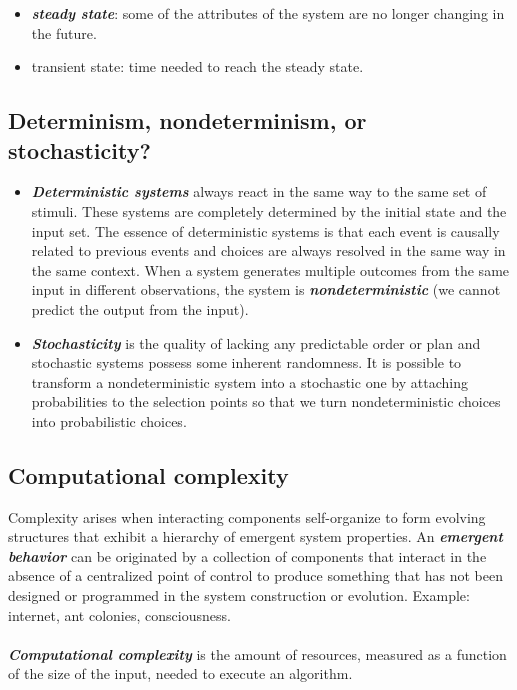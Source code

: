 \begin{itemize}
\tightlist
\item
  \textbf{\emph{steady state}}: some of the attributes of the system are
  no longer changing in the future.
\item
  transient state: time needed to reach the steady state.
\end{itemize}


\subsection{Determinism, nondeterminism, or stochasticity?}

\begin{itemize}
\tightlist
\item
  \textbf{\emph{Deterministic systems}} always react in the same way to
  the same set of stimuli. These systems are completely determined by
  the initial state and the input set. The essence of deterministic
  systems is that each event is causally related to previous events and
  choices are always resolved in the same way in the same context. When
  a system generates multiple outcomes from the same input in different
  observations, the system is \textbf{\emph{nondeterministic}} (we
  cannot predict the output from the input).
\item
  \textbf{\emph{Stochasticity}} is the quality of lacking any
  predictable order or plan and stochastic systems possess some inherent
  randomness. It is possible to transform a nondeterministic system into
  a stochastic one by attaching probabilities to the selection points so
  that we turn nondeterministic choices into probabilistic choices.
\end{itemize}


\subsection{Computational complexity}

Complexity arises when interacting components self-organize to form
evolving structures that exhibit a hierarchy of emergent system
properties. An \textbf{\emph{emergent behavior}} can be originated by a
collection of components that interact in the absence of a centralized
point of control to produce something that has not been designed or
programmed in the system construction or evolution. Example: internet,
ant colonies, consciousness.\\
\\
\noindent
\textbf{\emph{Computational complexity}} is the amount of resources,
measured as a function of the size of the input, needed to execute an
algorithm.


